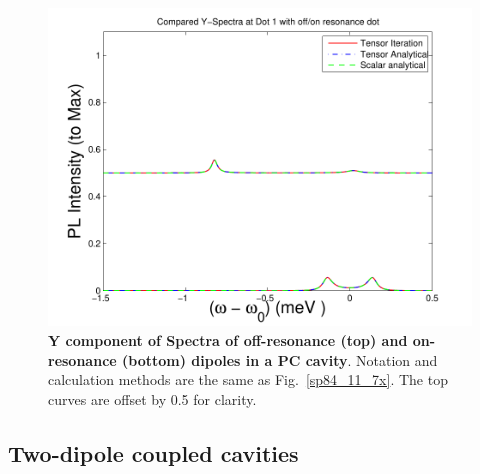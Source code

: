 \begin{figure}[H]
\centering
\begin{center}
\includegraphics[width=14cm]{./Figs/sp84_11_7y}
\end{center}
\caption[Y component of Spectra of off-resonance and on-resonance dipoles.]{\textbf{  Y component of Spectra of off-resonance (top) and on-resonance (bottom) dipoles in a PC cavity}. Notation and calculation methods are the same as Fig.~\ref{sp84_11_7x}. The top curves are offset by 0.5 for clarity.}
\label{sp84_11_7y}
\end{figure}



\subsection{Two-dipole coupled cavities}
